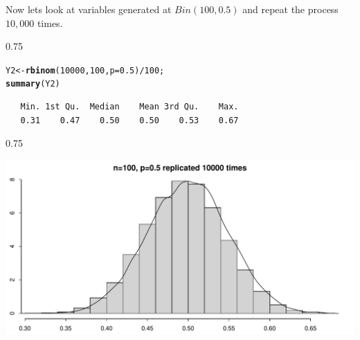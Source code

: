\documentclass{beamer}\usepackage[]{graphicx}\usepackage[]{color}
\makeatletter
\newcommand{\hlnum}[1]{\textcolor[rgb]{0.2,0.2,0.2}{#1}}%
\newcommand{\hlopt}[1]{\textcolor[rgb]{0.102,0.102,0.102}{#1}}%
\newcommand{\hlstd}[1]{\textcolor[rgb]{0.102,0.102,0.102}{#1}}%
\newcommand{\hlkwb}[1]{\textcolor[rgb]{0.102,0.102,0.102}{#1}}%
\newcommand{\hlkwc}[1]{\textcolor[rgb]{0.2,0.2,0.2}{#1}}%
\newcommand{\hlkwd}[1]{\textcolor[rgb]{0.102,0.102,0.102}{\textbf{#1}}}%
\newenvironment{kframe}{%
 \def\at@end@of@kframe{}%
 \ifinner\ifhmode%
  \def\at@end@of@kframe{\end{minipage}}%
  \begin{minipage}{\columnwidth}%
 \fi\fi%
 \def\FrameCommand##1{\hskip\@totalleftmargin \hskip-\fboxsep
 \colorbox{shadecolor}{##1}\hskip-\fboxsep
     \hskip-\linewidth \hskip-\@totalleftmargin \hskip\columnwidth}%
 \MakeFramed {\advance\hsize-\width
   \@totalleftmargin\z@ \linewidth\hsize
   \@setminipage}}%
 {\par\unskip\endMakeFramed%
 \at@end@of@kframe}
\newenvironment{knitrout}{}{} %
\renewenvironment{knitrout}{\begin{spacing}{0.75}\begin{tiny}}{\end{tiny}\end{spacing}}
\makeatother
\begin{document}
\begin{frame}[fragile]

Now lets look at variables generated at $Bin(100,0.5)$ and repeat the process $10,000$ times.

\begin{knitrout}\small
{}\color{fgcolor}\begin{kframe}
\begin{alltt}
\hlstd{Y2} \hlkwb{<-} \hlkwd{rbinom}\hlstd{(}\hlnum{10000}\hlstd{,} \hlnum{100}\hlstd{,} \hlkwc{p}\hlstd{=}\hlnum{0.5}\hlstd{)}\hlopt{/} \hlnum{100}\hlstd{;}
\hlkwd{summary}\hlstd{(Y2)}
\end{alltt}
\begin{verbatim}
   Min. 1st Qu.  Median    Mean 3rd Qu.    Max. 
   0.31    0.47    0.50    0.50    0.53    0.67 
\end{verbatim}
\end{kframe}
\end{knitrout}

\end{frame}

\begin{frame}[fragile]

\begin{knitrout}\small
{}\color{fgcolor}

{\centering \includegraphics[width=0.89\linewidth]{figure/graphics-unnamed-chunk-4-1} 

}



\end{knitrout}

\end{frame}
\end{document}
